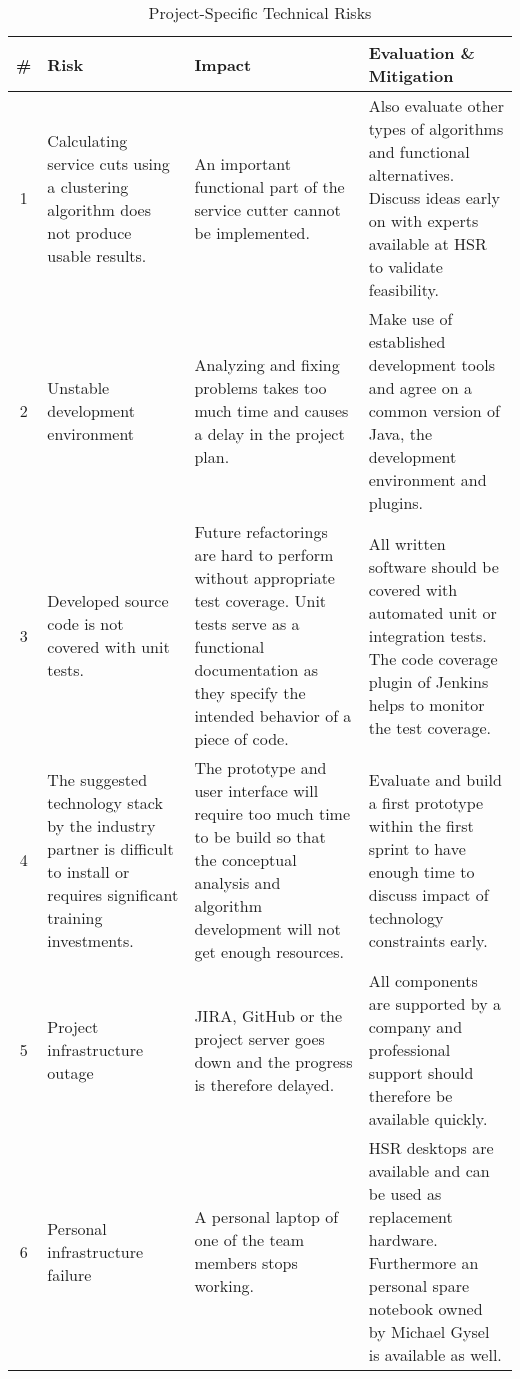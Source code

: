\begin{table}[H]
\begin{tabular}{|c|p{80pt} p{140pt} p{140pt}|}
	\hline \# & Risk & Impact & Evaluation \& Mitigation \\ 
	\hline 1 & Calculating service cuts using a clustering algorithm does not produce usable results. & An important functional part of the service cutter cannot be implemented. & Also evaluate other types of algorithms and functional alternatives. Discuss ideas early on with experts available at \gls{HSR} to validate feasibility. \\ 
	2 & Unstable development environment & Analyzing and fixing problems takes too much time and causes a delay in the project plan. & Make use of established development tools and agree on a common version of Java, the development environment and plugins. \\
	3 & Developed source code is not covered with unit tests. & Future refactorings are hard to perform without appropriate test coverage. Unit tests serve as a functional documentation as they specify the intended behavior of a piece of code. & All written software should be covered with automated unit or integration tests. The code coverage plugin of Jenkins helps to monitor the test coverage. \\
	4 & The suggested technology stack by the industry partner is difficult to install or requires significant training investments. & The prototype and user interface will require too much time to be build so that the conceptual analysis and algorithm development will not get enough resources. & Evaluate and build a first prototype within the first sprint to have enough time to discuss impact of technology constraints early.\\
	5 & Project infrastructure outage & JIRA, GitHub or the project server goes down and the progress is therefore delayed.  & All components are supported by a company and professional support should therefore be available quickly.  \\ 
	6 & Personal infrastructure failure & A personal laptop of one of the team members stops working. & HSR desktops are available and can be used as replacement hardware. Furthermore an personal spare notebook owned by Michael Gysel is available as well.  \\ 

	\hline
\end{tabular}
\caption{Project-Specific Technical Risks}
\label{tab:projtechnicalrisks}
\end{table}

